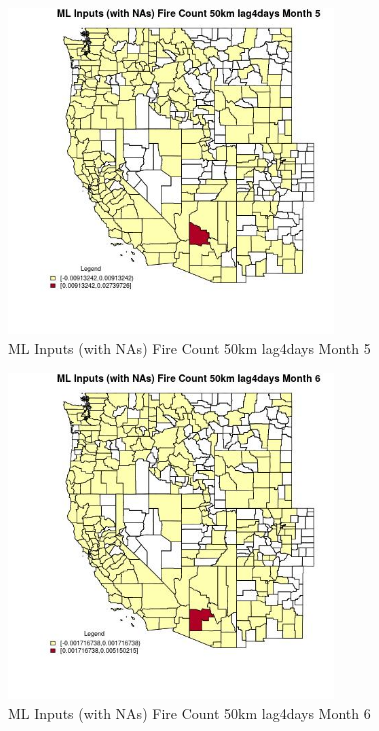 \begin{figure} 
\centering  
\includegraphics[width=0.77\textwidth]{Code_Outputs/Report_ML_input_PM25_Step4_part_e_de_duplicated_aves_compiled_2019-05-21wNAs_CountyFire_Count_50km_lag4daysmedianMonth5.jpg} 
\caption{\label{fig:Report_ML_input_PM25_Step4_part_e_de_duplicated_aves_compiled_2019-05-21wNAsCountyFire_Count_50km_lag4daysmedianMonth5}ML Inputs (with NAs) Fire Count 50km lag4days Month 5} 
\end{figure} 
 

\begin{figure} 
\centering  
\includegraphics[width=0.77\textwidth]{Code_Outputs/Report_ML_input_PM25_Step4_part_e_de_duplicated_aves_compiled_2019-05-21wNAs_CountyFire_Count_50km_lag4daysmedianMonth6.jpg} 
\caption{\label{fig:Report_ML_input_PM25_Step4_part_e_de_duplicated_aves_compiled_2019-05-21wNAsCountyFire_Count_50km_lag4daysmedianMonth6}ML Inputs (with NAs) Fire Count 50km lag4days Month 6} 
\end{figure} 
 

